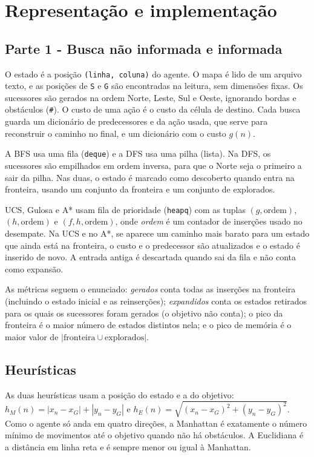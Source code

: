\documentclass[12pt]{article}
\begin{document}
\section{Representação e implementação}
\subsection{Parte 1 - Busca não informada e informada}
O estado é a posição \texttt{(linha, coluna)} do agente. O mapa é lido de um arquivo texto, e as posições de \texttt{S} e \texttt{G} são encontradas na leitura, sem dimensões fixas. Os sucessores são gerados na ordem Norte, Leste, Sul e Oeste, ignorando bordas e obstáculos (\texttt{\#}). O custo de uma ação é o custo da célula de destino. Cada busca guarda um dicionário de predecessores e da ação usada, que serve para reconstruir o caminho no final, e um dicionário com o custo $g(n)$.

A BFS usa uma fila (\texttt{deque}) e a DFS usa uma pilha (lista). Na DFS, os sucessores são empilhados em ordem inversa, para que o Norte seja o primeiro a sair da pilha. Nas duas, o estado é marcado como descoberto quando entra na fronteira, usando um conjunto da fronteira e um conjunto de explorados.

UCS, Gulosa e A* usam fila de prioridade (\texttt{heapq}) com as tuplas $(g, \text{ordem})$, $(h, \text{ordem})$ e $(f, h, \text{ordem})$, onde \emph{ordem} é um contador de inserções usado no desempate. Na UCS e no A*, se aparece um caminho mais barato para um estado que ainda está na fronteira, o custo e o predecessor são atualizados e o estado é inserido de novo. A entrada antiga é descartada quando sai da fila e não conta como expansão.

As métricas seguem o enunciado: \emph{gerados} conta todas as inserções na fronteira (incluindo o estado inicial e as reinserções); \emph{expandidos} conta os estados retirados para os quais os sucessores foram gerados (o objetivo não conta); o pico da fronteira é o maior número de estados distintos nela; e o pico de memória é o maior valor de $|\text{fronteira} \cup \text{explorados}|$.

\subsection{Heurísticas}
As duas heurísticas usam a posição do estado e a do objetivo: $h_M(n) = |x_n - x_G| + |y_n - y_G|$ e $h_E(n) = \sqrt{(x_n - x_G)^2 + (y_n - y_G)^2}$. Como o agente só anda em quatro direções, a Manhattan é exatamente o número mínimo de movimentos até o objetivo quando não há obstáculos. A Euclidiana é a distância em linha reta e é sempre menor ou igual à Manhattan.
\end{document}
